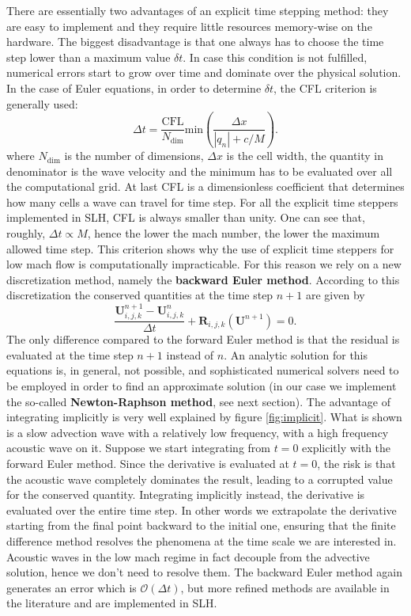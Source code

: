 There are essentially two advantages of an explicit time stepping method: they are easy to implement and they require little resources memory-wise on the hardware. The biggest disadvantage is that one always has to choose the time step lower than a maximum value $\delta t$. In case this condition is not fulfilled, numerical errors start to grow over time and dominate over the physical solution. In the case of Euler equations, in order to determine $\delta t$, the CFL criterion is generally used:
\begin{equation}\label{eq:cfl}
	\Delta t = \frac{\mathrm{CFL}}{N_{\mathrm{dim}}}\mathrm{min} \left(  \frac{\Delta x}{|q_n| + c/M}   \right).
\end{equation}
where $N_{\mathrm{dim}}$ is the number of dimensions, $\Delta x$ is the cell width, the quantity in denominator is the wave velocity and the minimum has to be evaluated over all the computational grid. At last CFL is a dimensionless coefficient that determines how many cells a wave can travel for time step. For all the explicit time steppers implemented in SLH, CFL is always smaller than unity. One can see that, roughly, $\Delta t \propto M$, hence the lower the mach number, the lower the maximum allowed time step. This criterion shows why the use of explicit time steppers for low mach flow is computationally impracticable.
For this reason we rely on a new discretization method, namely the \textbf{backward Euler method}. According to this discretization the conserved quantities at the time step $n+1$ are given by
\begin{equation}\label{eq:backward}
	\frac{\mathbf{U}^{n+1}_{i, j, k} - \mathbf{U}^{n}_{i, j, k}}{\Delta t} + \mathbf{R}_{i, j, k}(\mathbf{U}^{n+1})=0.
\end{equation}
The only difference compared to the forward Euler method is that the residual is evaluated at the time step $n+1$ instead of $n$. An analytic solution for this equations is, in general, not possible, and sophisticated numerical solvers need to be employed in order to find an approximate solution (in our case we implement the so-called \textbf{Newton-Raphson method}, see next section). The advantage of integrating implicitly is very well explained by figure \ref{fig:implicit}. What is shown is a slow advection wave with a relatively low frequency, with a high frequency acoustic wave on it. Suppose we start integrating from $t=0$ explicitly with the forward Euler method. Since the derivative is evaluated at $t=0$, the risk is that the acoustic wave completely dominates the result, leading to a corrupted value for the conserved quantity. Integrating implicitly instead, the derivative is evaluated over the entire time step. In other words we extrapolate the derivative starting from the final point backward to the initial one, ensuring that the finite difference method resolves the phenomena at the time scale we are interested in. Acoustic waves in the low mach regime in fact decouple from the advective solution, hence we don't need to resolve them. The backward Euler method again generates an error which is $\mathcal{O}(\Delta t)$, but more refined methods are available in the literature and are implemented in SLH. 

